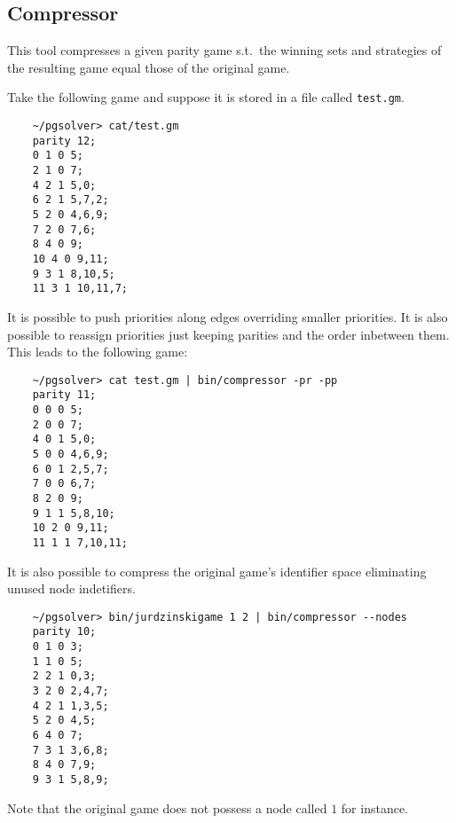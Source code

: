 \subsection{Compressor}

This tool compresses a given parity game s.t.\ the winning sets and strategies of
the resulting game equal those of the original game.

\begin{example}
Take the following game and suppose it is stored in a file called \verb#test.gm#.
\begin{verbatim}
    ~/pgsolver> cat/test.gm
    parity 12;
    0 1 0 5;
    2 1 0 7;
    4 2 1 5,0;
    6 2 1 5,7,2;
    5 2 0 4,6,9;
    7 2 0 7,6;
    8 4 0 9;
    10 4 0 9,11;
    9 3 1 8,10,5;
    11 3 1 10,11,7;
\end{verbatim}
It is possible to push priorities along edges overriding smaller priorities. It is also possible
to reassign priorities just keeping parities and the order inbetween them. This leads to the
following game:
\begin{verbatim}
    ~/pgsolver> cat test.gm | bin/compressor -pr -pp
    parity 11;
    0 0 0 5;
    2 0 0 7;
    4 0 1 5,0;
    5 0 0 4,6,9;
    6 0 1 2,5,7;
    7 0 0 6,7;
    8 2 0 9;
    9 1 1 5,8,10;
    10 2 0 9,11;
    11 1 1 7,10,11;
\end{verbatim}
It is also possible to compress the original game's identifier space eliminating unused node indetifiers.
\begin{verbatim}
    ~/pgsolver> bin/jurdzinskigame 1 2 | bin/compressor --nodes
    parity 10;
    0 1 0 3;
    1 1 0 5;
    2 2 1 0,3;
    3 2 0 2,4,7;
    4 2 1 1,3,5;
    5 2 0 4,5;
    6 4 0 7;
    7 3 1 3,6,8;
    8 4 0 7,9;
    9 3 1 5,8,9;
\end{verbatim}
Note that the original game does not possess a node called $1$ for instance.
\end{example}

